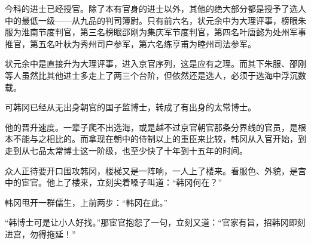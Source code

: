 今科的进士已经授官。除了本有官身的进士以外，其他的绝大部分都是授予了选人中的最低一级——从九品的判司簿尉。只有前六名，状元余中为大理评事，榜眼朱服为淮南节度判官，第三名榜眼邵刚为集庆军节度判官，第四名叶唐懿为处州军事推官，第五名叶杕为秀州司户参军，第六名练亨甫为睦州司法参军。

状元余中是直接升为大理评事，进入京官序列，这是应有之理。而其下朱服、邵刚等人虽然比其他进士多走上了两三个台阶，但依然还是选人，必须于选海中浮沉数载。

可韩冈已经从无出身朝官的国子监博士，转成了有出身的太常博士。

他的晋升速度。一辈子爬不出选海，或是越不过京官朝官那条分界线的官员，是根本不能与之相比的。而拿现在朝中的侍制以上的重臣来比较，韩冈从入官开始，到走到从七品太常博士这一阶级，也至少快了十年到十五年的时间。

众人正待要开口围攻韩冈，楼梯又是一阵响，一人上了楼来。看服色、外貌，是宫中的宦官。他上了楼来，立刻尖着嗓子叫道：“韩冈何在？”

韩冈甩开一群儒生，上前两步：“韩冈在此。”

“韩博士可是让小人好找。”那宦官抱怨了一句，立刻又道：“官家有旨，招韩冈即刻进宫，勿得拖延！”

